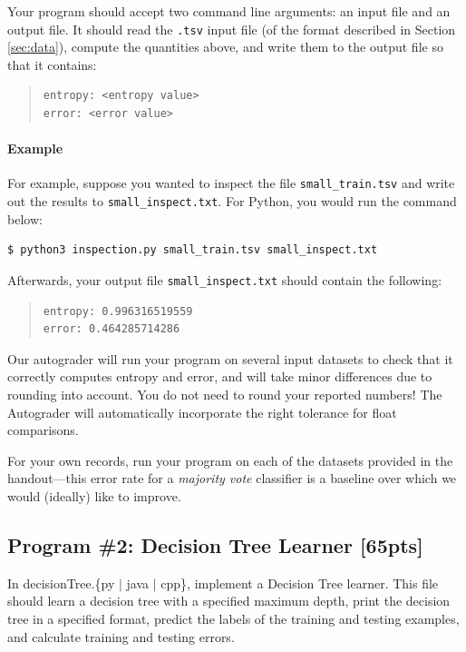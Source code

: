 \documentclass[11pt,addpoints,answers]{exam}
\begin{document}
Your program should accept two command line arguments: an input file and an output file. It should read the \lstinline{.tsv} input file (of the format described in Section \ref{sec:data}), compute the quantities above, and write them to the output file so that it contains:
\begin{quote}
\begin{verbatim}
entropy: <entropy value>
error: <error value>
\end{verbatim}
\end{quote}

\paragraph{Example}

For example, suppose you wanted to inspect the file \lstinline{small_train.tsv} and write out the results to \lstinline{small_inspect.txt}. For Python, you would run the command below:
%
\begin{lstlisting}[language=Shell]
$ python3 inspection.py small_train.tsv small_inspect.txt
\end{lstlisting}
%
Afterwards, your output file \lstinline{small_inspect.txt} should contain the following:
%
\begin{quote}
\begin{verbatim}
entropy: 0.996316519559
error: 0.464285714286
\end{verbatim}
\end{quote}
%
Our autograder will run your program on several input datasets to check that it correctly computes entropy and error, and will take minor differences due to rounding into account. You do not need to round your reported numbers! The Autograder will automatically incorporate the right tolerance for float comparisons.

\begin{notebox}
For your own records, run your program on each of the datasets provided in the handout---this error rate for a \emph{majority vote} classifier is a baseline over which we would (ideally) like to improve.
\end{notebox}

\newpage
\subsection{Program \#2: Decision Tree Learner [65pts]}
\label{sec:decisiontree}

In decisionTree.\{py $\mid$ java $\mid$ cpp\}, implement a Decision Tree learner. This file should learn a decision tree with a specified maximum depth, print the decision tree in a specified format, predict the labels of the training and testing examples, and calculate training and testing errors.
\end{document}
